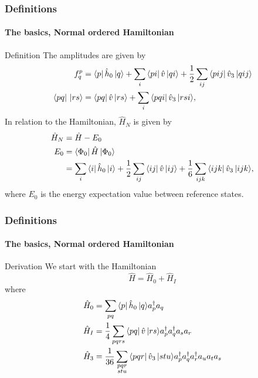 \begin{frame}[fragile]
    \frametitle{Definitions}
    \framesubtitle{The basics, Normal ordered Hamiltonian}

    \small
    \begin{block}{Definition}
    The amplitudes are given by
    \begin{subequations}
    \begin{align*}
        f_q^p &= \bra{p}\hat{h}_0\,|{q}\rangle + \sum_i \bra{pi}\hat{v}\,|{qi}\rangle 
            + \frac{1}{2} \sum_{ij} \bra{pij}\hat{v}_3\,|{qij}\rangle \\
        \bra{pq}\,|{rs}\rangle &= \bra{pq}\hat{v}\,|{rs}\rangle + \sum_i \bra{pqi}\hat{v}_3\,|{rsi}\rangle,
    \end{align*}
    \end{subequations}
    In relation to the Hamiltonian, $\hat{H}_N$ is given by
    \begin{align*}
        \hat{H}_N &= \hat{H} - E_0 \\
        E_0 &= \bra{\Phi_0}\hat{H}\,|{\Phi_0}\rangle \\
            &= \sum_i \bra{i}\hat{h}_0\,|{i}\rangle
                + \frac{1}{2} \sum_{ij} \bra{ij}\hat{v}\,|{ij}\rangle
                + \frac{1}{6} \sum_{ijk} \bra{ijk}\hat{v}_3\,|{ijk}\rangle,
    \end{align*}
    where $E_0$ is the energy expectation value between reference states.
    \end{block}


\end{frame}

\begin{frame}[fragile]
    \frametitle{Definitions}
    \framesubtitle{The basics, Normal ordered Hamiltonian}

    \small
    \begin{block}{Derivation}
    We start with the Hamiltonian
    \begin{equation*}
        \hat{H} = \hat{H}_0 + \hat{H}_I
    \end{equation*}
    where
    \begin{subequations}
        \begin{align*}
        \hat{H}_0 &= \sum_{pq} \bra{p}\hat{h}_0\,|{q}\rangle a^\dagger_p a_q \\
        \hat{H}_I &= \frac{1}{4} \sum_{pqrs} \bra{pq}\hat{v}\,|{rs}\rangle a^\dagger_p a^\dagger_q a_s  a_r \\
        \hat{H}_3 &= \frac{1}{36} \sum_{\substack{
                            pqr \\
                            stu}}
                     \bra{pqr}\hat{v}_3\,|{stu}\rangle a^\dagger_p a^\dagger_q a^\dagger_r a_u a_t a_s
        \end{align*}
    \end{subequations}

    \end{block}

\end{frame}

